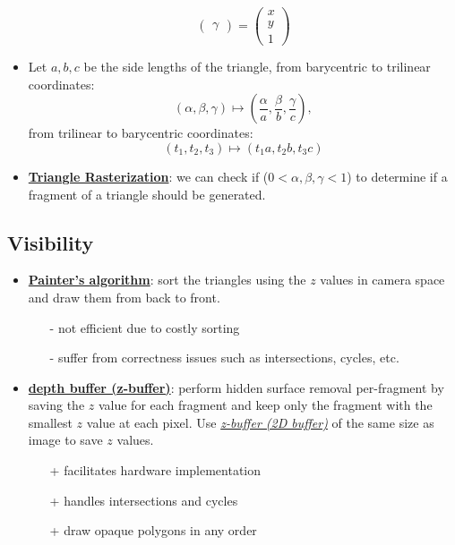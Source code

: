 \documentclass[twocolumn,landscape,10pt]{article}
\theoremstyle{definition}
\begin{document}
\begin{itemize}
\[\begin{pmatrix}
                \gamma
            \end{pmatrix} 
            =
            \begin{pmatrix}
                x \\
                y \\
                1
            \end{pmatrix} 
        \]
    \item Let $a,b,c$ be the side lengths of the triangle,
        from barycentric to trilinear coordinates:
        \[
            (\alpha,\beta,\gamma)\mapsto(\frac{\alpha}{a},\frac{\beta}{b},\frac{\gamma}{c}),
        \]
        from trilinear to barycentric coordinates:
        \[
            (t_1,t_2,t_3)\mapsto(t_1a,t_2b,t_3c)
        \]
    \item \underline{\textbf{Triangle Rasterization}}:
        we can check if ($0<\alpha,\beta,\gamma<1$) to determine if
        a fragment of a triangle should be generated.
\end{itemize} 

\subsection{Visibility}

\begin{itemize}
    \item \underline{\textbf{Painter's algorithm}}: sort the triangles using the
        $z$ values in camera space and draw them from back to front.
        \begin{itemize}
            \item[-] not efficient due to costly sorting
            \item[-] suffer from correctness issues such as intersections,
                cycles, etc.
        \end{itemize} 
    \item \underline{\textbf{depth buffer (z-buffer)}}: perform hidden surface
        removal per-fragment by saving the $z$ value for each fragment and keep
        only the fragment with the smallest $z$ value at each pixel. Use
        \underline{\emph{z-buffer (2D buffer)}} of the same size as image to
        save $z$ values.
        \begin{itemize}
            \item[+] facilitates hardware implementation
            \item[+] handles intersections and cycles
            \item[+] draw opaque polygons in any order
        \end{itemize} 
\end{itemize} 
\end{document}
